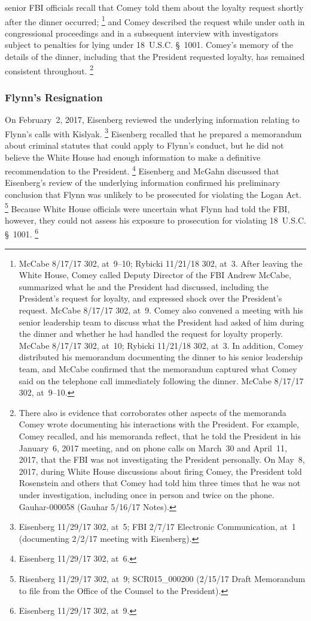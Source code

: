 senior FBI officials recall that Comey told them about the loyalty request shortly after the dinner occurred;%
\footnote{McCabe 8/17/17 302, at~9--10;
Rybicki 11/21/18 302, at~3.
After leaving the White House, Comey called Deputy Director of the FBI Andrew McCabe, summarized what he and the President had discussed, including the President's request for loyalty, and expressed shock over the President's request.
McCabe 8/17/17 302, at~9.
Comey also convened a meeting with his senior leadership team to discuss what the President had asked of him during the dinner and whether he had handled the request for loyalty properly.
McCabe 8/17/17 302, at~10;
Rybicki 11/21/18 302, at~3.
In addition, Comey distributed his memorandum documenting the dinner to his senior leadership team, and McCabe confirmed that the memorandum captured what Comey said on the telephone call immediately following the dinner.
McCabe 8/17/17 302, at~9--10.}
and Comey described the request while under oath in congressional proceedings and in a subsequent interview with investigators subject to penalties for lying under 18~U.S.C. \S~1001.
Comey's memory of the details of the dinner, including that the President requested loyalty, has remained consistent throughout.%
\footnote{There also is evidence that corroborates other aspects of the memoranda Comey wrote documenting his interactions with the President.
For example, Comey recalled, and his memoranda reflect, that he told the President in his January~6, 2017 meeting, and on phone calls on March~30 and April~11, 2017, that the FBI was not investigating the President personally.
On May~8, 2017, during White House discussions about firing Comey, the President told Rosenstein and others that Comey had told him three times that he was not under investigation, including once in person and twice on the phone.
Gauhar-000058 (Gauhar 5/16/17 Notes).}

\subsubsection{Flynn's Resignation}

On February~2, 2017, Eisenberg reviewed the underlying information relating to Flynn's calls with Kislyak.%
\footnote{Eisenberg 11/29/17 302, at~5;
FBI 2/7/17 Electronic Communication, at~1 (documenting 2/2/17 meeting with Eisenberg).}
Eisenberg recalled that he prepared a memorandum about criminal statutes that could apply to Flynn's conduct, but he did not believe the White House had enough information to make a definitive recommendation to the President.%
\footnote{Eisenberg 11/29/17 302, at~6.}
Eisenberg and McGahn discussed that Eisenberg's review of the underlying information confirmed his preliminary conclusion that Flynn was unlikely to be prosecuted for violating the Logan Act.%
\footnote{Risenberg 11/29/17 302, at~9;
SCR015\_000200 (2/15/17 Draft Memorandum to file from the Office of the Counsel to the President).}
Because White House officials were uncertain what Flynn had told the FBI, however, they could not assess his exposure to prosecution for violating 18~U.S.C. \S~1001.%
\footnote{Eisenberg 11/29/17 302, at~9.}

